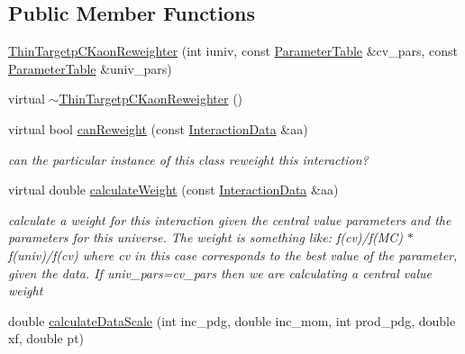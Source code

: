 \subsection*{Public Member Functions}
\begin{DoxyCompactItemize}
\item 
\hyperlink{class_neutrino_flux_reweight_1_1_thin_targetp_c_kaon_reweighter_a00eeb5526f6f7af21035e70c8bee17d1}{Thin\-Targetp\-C\-Kaon\-Reweighter} (int iuniv, const \hyperlink{class_neutrino_flux_reweight_1_1_parameter_table}{Parameter\-Table} \&cv\-\_\-pars, const \hyperlink{class_neutrino_flux_reweight_1_1_parameter_table}{Parameter\-Table} \&univ\-\_\-pars)
\item 
virtual \hyperlink{class_neutrino_flux_reweight_1_1_thin_targetp_c_kaon_reweighter_ae7931d91d1e743fe87d8b3862a11b37f}{$\sim$\-Thin\-Targetp\-C\-Kaon\-Reweighter} ()
\item 
virtual bool \hyperlink{class_neutrino_flux_reweight_1_1_thin_targetp_c_kaon_reweighter_a78d9307c378b36d660feb54ba8114a9a}{can\-Reweight} (const \hyperlink{class_neutrino_flux_reweight_1_1_interaction_data}{Interaction\-Data} \&aa)
\begin{DoxyCompactList}\small\item\em can the particular instance of this class reweight this interaction? \end{DoxyCompactList}\item 
virtual double \hyperlink{class_neutrino_flux_reweight_1_1_thin_targetp_c_kaon_reweighter_a64f5f6df3b44240b56b863206773ca9a}{calculate\-Weight} (const \hyperlink{class_neutrino_flux_reweight_1_1_interaction_data}{Interaction\-Data} \&aa)
\begin{DoxyCompactList}\small\item\em calculate a weight for this interaction given the central value parameters and the parameters for this universe. The weight is something like\-: f(cv)/f(M\-C) $\ast$ f(univ)/f(cv) where cv in this case corresponds to the best value of the parameter, given the data. If univ\-\_\-pars=cv\-\_\-pars then we are calculating a central value weight \end{DoxyCompactList}\item 
double \hyperlink{class_neutrino_flux_reweight_1_1_thin_targetp_c_kaon_reweighter_a60ee6eb8b7a376145a4ec0780a0d812d}{calculate\-Data\-Scale} (int inc\-\_\-pdg, double inc\-\_\-mom, int prod\-\_\-pdg, double xf, double pt)
\end{DoxyCompactItemize}
